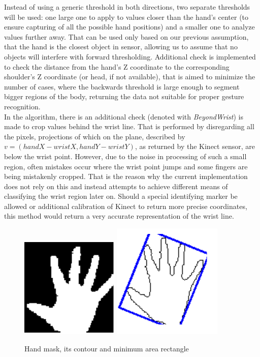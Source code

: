 \documentclass[a4paper,11pt,oneside]{article}
\begin{document}
Instead of using a generic threshold in both directions, two separate thresholds will be used: one large one to apply to values closer than the hand's center (to ensure capturing of all the possible hand positions) and a smaller one to analyze values further away. That can be used only based on our previous assumption, that the hand is the closest object in sensor, allowing us to assume that no objects will interfere with forward thresholding. Additional check is implemented to check the distance from the hand's Z coordinate to the corresponding shoulder's Z coordinate (or head, if not available), that is aimed to minimize the number of cases, where the backwards threshold is large enough to segment bigger regions of the body, returning the data not suitable for proper gesture recognition.\\

In the algorithm, there is an additional check (denoted with \textit{BeyondWrist}) is made to crop values behind the wrist line. That is performed by disregarding all the pixels, projections of which on the plane, described by $v = (handX - wristX, handY - wristY)$, as returned by the Kinect sensor, are below the wrist point. However, due to the noise in processing of such a small region, often mistakes occur where the wrist point jumps and some fingers are being mistakenly cropped. That is the reason why the current implementation does not rely on this and instead attempts to achieve different means of classifying the wrist region later on. Should a special identifying marker be allowed or additional calibration of Kinect  to return more precise coordinates, this method would return a very accurate representation of the wrist line.

\begin{figure}[H]
\centering
\includegraphics[scale=1.5]{hand-mask.png}
\includegraphics[scale=1.5]{hand-box.png}
\caption{Hand mask, its contour and minimum area rectangle}
\end{figure}
\end{document}
